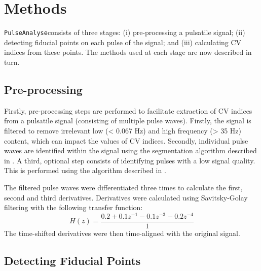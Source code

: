 \documentclass[12pt]{iopart}
\newcommand{\pa}{\texttt{PulseAnalyse}}
\begin{document}
\section{Methods}

\pa consists of three stages: (i) pre-processing a pulsatile signal; (ii) detecting fiducial points on each pulse of the signal; and (iii) calculating CV indices from these points. The methods used at each stage are now described in turn.

\subsection{Pre-processing}

Firstly, pre-processing steps are performed to facilitate extraction of CV indices from a pulsatile signal (consisting of multiple pulse waves). Firstly, the signal is filtered to remove irrelevant low (\textless{} 0.067 Hz) and high frequency (\textgreater{} 35 Hz) content, which can impact the values of CV indices. Secondly, individual pulse waves are identified within the signal using the segmentation algorithm described in \cite{Karlen2012}. A third, optional step consists of identifying pulses with a low signal quality. This is performed using the algorithm described in \cite{Orphanidou2015}.

The filtered pulse waves were differentiated three times to calculate the first, second and third derivatives. Derivatives were calculated using Savitsky-Golay filtering with the following transfer function:
\begin{equation}
H(z) = \frac{0.2 + 0.1 z^{-1} - 0.1 z^{-3} - 0.2 z^{-4}}{1}
\end{equation}
The time-shifted derivatives were then time-aligned with the original signal. 

\subsection{Detecting Fiducial Points}
\end{document}
